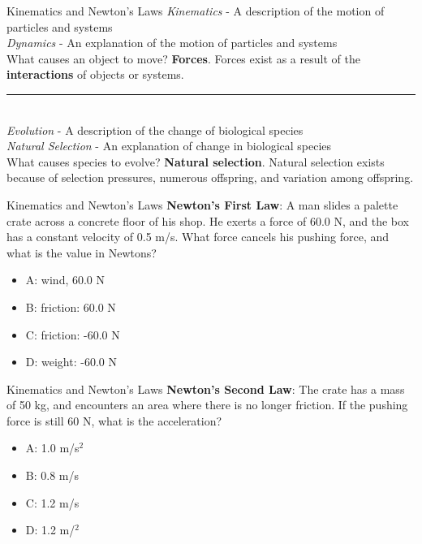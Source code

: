 \documentclass{beamer}
\begin{document}
\begin{frame}{Kinematics and Newton's Laws}
\small
\textit{Kinematics} - A \alert{description} of the motion of particles and systems \\
\textit{Dynamics} - An \alert{explanation} of the motion of particles and systems \\
\vspace{0.25cm}
What causes an object to move?  \textbf{Forces}.  Forces exist as a result of the \alert{\textbf{interactions}} of objects or systems.\\
\vspace{0.25cm}
\rule{10cm}{0.4pt} \\
\vspace{0.25cm}
\textit{Evolution} - A \alert{description} of the change of biological species \\
\textit{Natural Selection} - An \alert{explanation} of change in biological species \\
\vspace{0.25cm}
What causes species to evolve?  \textbf{Natural selection}.  Natural selection exists because of \alert{selection pressures}, \alert{numerous offspring}, and \alert{variation} among offspring.
\end{frame}

\begin{frame}{Kinematics and Newton's Laws}
\textbf{Newton's First Law}: A man slides a palette crate across a concrete floor of his shop.  He exerts a force of 60.0 N, and the box has a constant velocity of 0.5 m/s.  What force cancels his pushing force, and what is the value in Newtons?
\begin{itemize}
\item A: wind, 60.0 N
\item B: friction: 60.0 N
\item C: friction: -60.0 N
\item D: weight: -60.0 N
\end{itemize}
\end{frame}

\begin{frame}{Kinematics and Newton's Laws}
\textbf{Newton's Second Law}: The crate has a mass of 50 kg, and encounters an area where there is no longer friction.  If the pushing force is still 60 N, what is the acceleration?
\begin{itemize}
\item A: 1.0 m/s$^2$
\item B: 0.8 m/s
\item C: 1.2 m/s
\item D: 1.2 m/$^2$
\end{itemize}
\end{frame}
\end{document}

